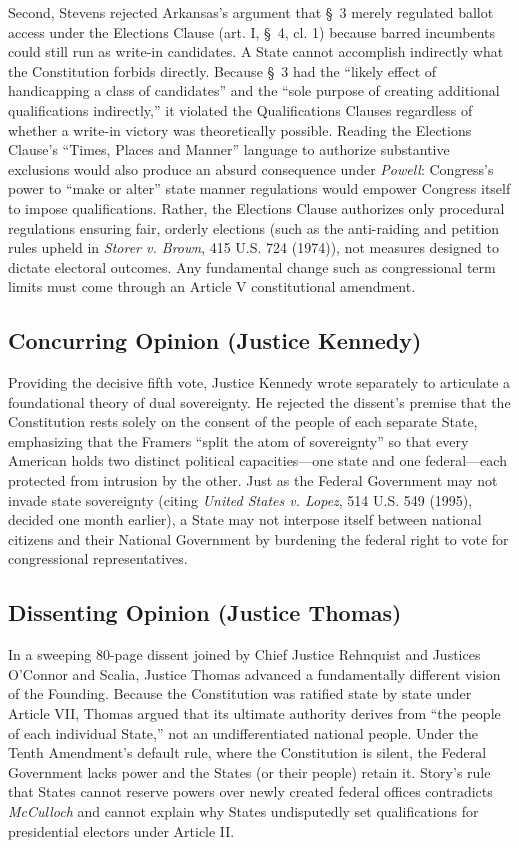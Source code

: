 \documentclass[12pt]{article}
\begin{document}
Second, Stevens rejected Arkansas's argument that \S~3 merely regulated ballot access under the Elections Clause (art. I, \S~4, cl. 1) because barred incumbents could still run as write-in candidates. A State cannot accomplish indirectly what the Constitution forbids directly. Because \S~3 had the ``likely effect of handicapping a class of candidates'' and the ``sole purpose of creating additional qualifications indirectly,'' it violated the Qualifications Clauses regardless of whether a write-in victory was theoretically possible. Reading the Elections Clause's ``Times, Places and Manner'' language to authorize substantive exclusions would also produce an absurd consequence under \textit{Powell}: Congress's power to ``make or alter'' state manner regulations would empower Congress itself to impose qualifications. Rather, the Elections Clause authorizes only procedural regulations ensuring fair, orderly elections (such as the anti-raiding and petition rules upheld in \textit{Storer v. Brown}, 415 U.S. 724 (1974)), not measures designed to dictate electoral outcomes. Any fundamental change such as congressional term limits must come through an Article V constitutional amendment.

\subsection{Concurring Opinion (Justice Kennedy)}

Providing the decisive fifth vote, Justice Kennedy wrote separately to articulate a foundational theory of dual sovereignty. He rejected the dissent's premise that the Constitution rests solely on the consent of the people of each separate State, emphasizing that the Framers ``split the atom of sovereignty'' so that every American holds two distinct political capacities---one state and one federal---each protected from intrusion by the other. Just as the Federal Government may not invade state sovereignty (citing \textit{United States v. Lopez}, 514 U.S. 549 (1995), decided one month earlier), a State may not interpose itself between national citizens and their National Government by burdening the federal right to vote for congressional representatives.

\subsection{Dissenting Opinion (Justice Thomas)}

In a sweeping 80-page dissent joined by Chief Justice Rehnquist and Justices O'Connor and Scalia, Justice Thomas advanced a fundamentally different vision of the Founding. Because the Constitution was ratified state by state under Article VII, Thomas argued that its ultimate authority derives from ``the people of each individual State,'' not an undifferentiated national people. Under the Tenth Amendment's default rule, where the Constitution is silent, the Federal Government lacks power and the States (or their people) retain it. Story's rule that States cannot reserve powers over newly created federal offices contradicts \textit{McCulloch} and cannot explain why States undisputedly set qualifications for presidential electors under Article II.
\end{document}
